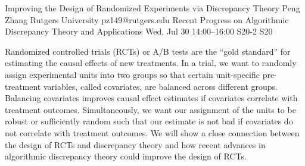 \begin{talk}
  {Improving the Design of Randomized Experiments via Discrepancy Theory}%
  {Peng Zhang}%
  {Rutgers University}%
  {pz149@rutgers.edu}%
  {Recent Progress on Algorithmic Discrepancy Theory and Applications}%
  {}%
  {Wed, Jul 30 14:00–16:00}%
  {S20-2}%
  {S20}%
				
			
Randomized controlled trials (RCTs) or A/B tests are the ``gold standard'' for estimating the causal effects of new treatments. In a trial, we want to randomly assign experimental units into two groups so that certain unit-specific pre-treatment variables, called covariates, are balanced across different groups. Balancing covariates improves causal effect estimates if covariates correlate with treatment outcomes. Simultaneously, we want our assignment of the units to be robust or sufficiently random such that our estimate is not bad if covariates do not correlate with treatment outcomes. We will show a close connection between the design of RCTs and discrepancy theory and how recent advances in algorithmic discrepancy theory could improve the design of RCTs.

\medskip


\end{talk}

